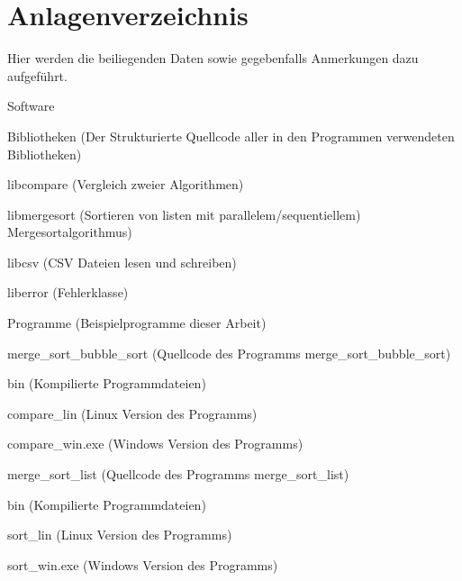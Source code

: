 \chapter*{Anlagenverzeichnis}
Hier werden die beiliegenden Daten sowie gegebenfalls Anmerkungen dazu aufgeführt.

\begin{deepitemize}
\item Software
\begin{deepitemize}
\item Bibliotheken (Der Strukturierte Quellcode aller in den Programmen verwendeten Bibliotheken)
\begin{deepitemize}
\item libcompare (Vergleich zweier Algorithmen)
\item libmergesort (Sortieren von listen mit parallelem/sequentiellem) 					 Mergesortalgorithmus)
\item libcsv (CSV Dateien lesen und schreiben)
\item liberror (Fehlerklasse)
\end{deepitemize}

\item Programme (Beispielprogramme dieser Arbeit)
\begin{deepitemize}
\item merge\_sort\_bubble\_sort (Quellcode des Programms merge\_sort\_bubble\_sort)
\begin{deepitemize}
\item bin (Kompilierte Programmdateien)
\begin{deepitemize}
\item compare\_lin (Linux Version des Programms)
\item compare\_win.exe (Windows Version des Programms)
\end{deepitemize}
\end{deepitemize}
\item merge\_sort\_list (Quellcode des Programms merge\_sort\_list)
\begin{deepitemize}
\item bin (Kompilierte Programmdateien)
\begin{deepitemize}
\item sort\_lin (Linux Version des Programms)
\item sort\_win.exe (Windows Version des Programms)
\end{deepitemize}
\end{deepitemize}
\end{deepitemize}


\end{deepitemize}
\end{deepitemize}
